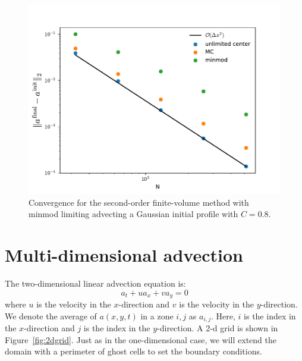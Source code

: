 \begin{figure}[t]
\centering
\includegraphics[width=0.8\linewidth]{plm-converge}
\caption[Convergence of second-order finite-volume advection]
        {\label{fig:advnorm} Convergence for the second-order
          finite-volume method with minmod limiting advecting a
          Gaussian initial profile with $C = 0.8$.}
\end{figure}

\section{Multi-dimensional advection}

The two-dimensional linear advection equation is:
\begin{equation}
a_t + u a_x + v a_y = 0
\label{eq:advect2d}
\end{equation}
where $u$ is the velocity in the $x$-direction and $v$ is the velocity in
the $y$-direction.  We denote the average of $a(x,y,t)$ in a zone $i,j$ as
$a_{i,j}$.  Here, $i$ is the index in the $x$-direction and $j$ is the
index in the $y$-direction.  A 2-d grid is shown in Figure~\ref{fig:2dgrid}.
Just as in the one-dimensional case, we will extend the domain with a
perimeter of ghost cells to set the boundary conditions.

